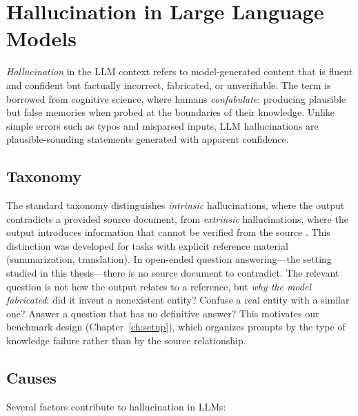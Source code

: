\section{Hallucination in Large Language Models}
\label{sec:bg-hallucination}

\emph{Hallucination} in the LLM context refers to model-generated content that is fluent and confident but factually incorrect, fabricated, or unverifiable. The term is borrowed from cognitive science, where humans \emph{confabulate}: producing plausible but false memories when probed at the boundaries of their knowledge. Unlike simple errors such as typos and misparsed inputs, LLM hallucinations are plausible-sounding statements generated with apparent confidence.

\subsection{Taxonomy}
\label{sec:bg-halluc-taxonomy}

The standard taxonomy distinguishes \emph{intrinsic} hallucinations, where the output contradicts a provided source document, from \emph{extrinsic} hallucinations, where the output introduces information that cannot be verified from the source \citep{ji2023survey, maynez2020faithfulness}. This distinction was developed for tasks with explicit reference material (summarization, translation). In open-ended question answering---the setting studied in this thesis---there is no source document to contradict. The relevant question is not how the output relates to a reference, but \emph{why the model fabricated}: did it invent a nonexistent entity? Confuse a real entity with a similar one? Answer a question that has no definitive answer? This motivates our benchmark design (Chapter~\ref{ch:setup}), which organizes prompts by the type of knowledge failure rather than by the source relationship.

\subsection{Causes}
\label{sec:bg-halluc-causes}

Several factors contribute to hallucination in LLMs:

